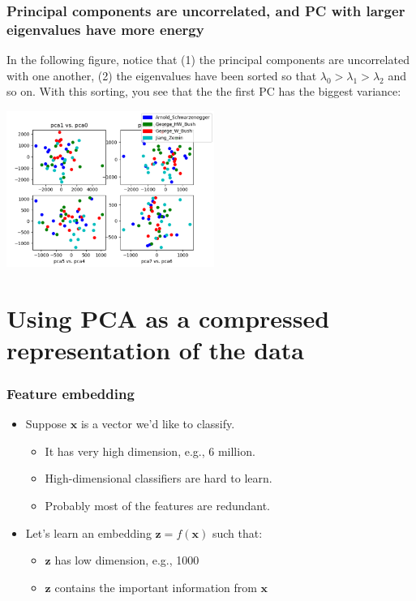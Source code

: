 \documentclass{beamer}
\begin{document}
\begin{frame}
  \frametitle{Principal components are uncorrelated, and PC with
    larger eigenvalues have more energy}

  In the following figure, notice that (1) the principal components
  are uncorrelated with one another, (2) the eigenvalues have been
  sorted so that $\lambda_0>\lambda_1>\lambda_2$ and so on. With this
  sorting, you see that the the first PC has the biggest
  variance:

  \centerline{\includegraphics[height=2in]{figs/pca_samples.png}}
\end{frame}

\section[PCA Features]{Using PCA as a compressed representation of the data}
\setcounter{subsection}{1}

\begin{frame}
  \frametitle{Feature embedding}

  \begin{itemize}
  \item Suppose $\mathbf{x}$ is a vector we'd like to classify.
    \begin{itemize}
    \item It has very high dimension, e.g., 6 million.
    \item High-dimensional classifiers are hard to learn.
    \item Probably most of the features are redundant.
    \end{itemize}
  \item Let's learn an embedding $\mathbf{z}=f(\mathbf{x})$ such that:
    \begin{itemize}
    \item $\mathbf{z}$ has low dimension, e.g., 1000
    \item $\mathbf{z}$ contains the important information from $\mathbf{x}$
    \end{itemize}
  \end{itemize}
\end{frame}
\end{document}
